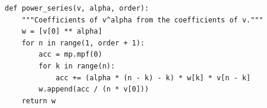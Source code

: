 \begin{verbatim}
def power_series(v, alpha, order):
    """Coefficients of v^alpha from the coefficients of v."""
    w = [v[0] ** alpha]
    for n in range(1, order + 1):
        acc = mp.mpf(0)
        for k in range(n):
            acc += (alpha * (n - k) - k) * w[k] * v[n - k]
        w.append(acc / (n * v[0]))
    return w
\end{verbatim}
